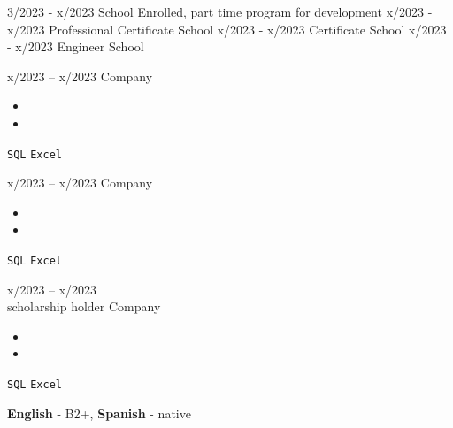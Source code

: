 \documentclass[9pt]{developercv} %
\begin{document}
\vspace{-10 pt}
\begin{entrylist}
    \entry
		{3/2023 - x/2023}
		{\lipsum[1][1] }
		{School}
		{Enrolled, part time program for development}
    \entry
		{x/2023 - x/2023}
		{Professional Certificate}
		{School}
		{\lipsum[1][1]}
	\entry
		{x/2023 - x/2023}
		{Certificate}
		{School}
		{\lipsum[1][2]}
	\entry
		{x/2023 - x/2023}
		{Engineer}
		{School}
		{\lipsum[1][2]}
\end{entrylist}

\vspace{-10 pt}
\begin{entrylist}
	\entry
        {x/2023 -- x/2023}
		{\lipsum[1][1]}
		{Company}
		{\vspace{-10pt}
        \begin{itemize}[noitemsep,topsep=0pt,parsep=0pt,partopsep=0pt, leftmargin=-1pt]
            \item \lipsum[1][1-2]
            \item \lipsum[1][3-4]
        \end{itemize} 
        \texttt{SQL} \slashsep \texttt{Excel}}
	\entry
		{x/2023 -- x/2023}
		{\lipsum[1][1]}
		{Company}
		{\vspace{-10pt}
        \begin{itemize}[noitemsep,topsep=0pt,parsep=0pt,partopsep=0pt, leftmargin=-1pt]
            \item \lipsum[1][1-2]
            \item \lipsum[1][3-4]
        \end{itemize} 
        \texttt{SQL} \slashsep \texttt{Excel}}
	\entry
		{x/2023 -- x/2023 \\\footnotesize{scholarship holder}}
		{\lipsum[1][1]}
		{Company}
		{\vspace{-10pt}
        \begin{itemize}[noitemsep,topsep=0pt,parsep=0pt,partopsep=0pt, leftmargin=-1pt]
            \item \lipsum[1][1-2]
            \item \lipsum[1][3-4]
        \end{itemize} 
        \texttt{SQL} \slashsep \texttt{Excel}}
\end{entrylist}

\vspace{-10 pt}
    \vspace{-6pt}
    
    \hspace{26mm} \textbf{English} - B2+, \textbf{ Spanish} - native

\end{document}
